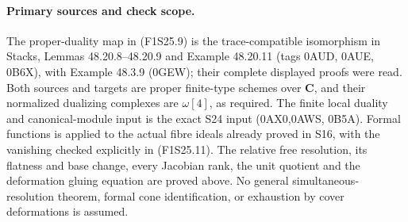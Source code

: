 \paragraph{Primary sources and check scope.}
The proper-duality map in (F1S25.9) is the trace-compatible
isomorphism in Stacks, Lemmas 48.20.8--48.20.9 and
Example 48.20.11 (tags 0AUD, 0AUE, 0B6X), with
Example 48.3.9 (0GEW); their complete displayed proofs were
read. Both sources and targets are proper finite-type schemes
over $\mathbf C$, and their normalized dualizing complexes
are $\omega[4]$, as required. The finite local duality and
canonical-module input is the exact S24 input (0AX0,0AWS,
0B5A). Formal functions is applied to the actual fibre ideals
already proved in S16, with the vanishing checked explicitly
in (F1S25.11). The relative free resolution, its flatness and
base change, every Jacobian rank, the unit quotient and the
deformation gluing equation are proved above. No general
simultaneous-resolution theorem, formal cone identification,
or exhaustion by cover deformations is assumed.
